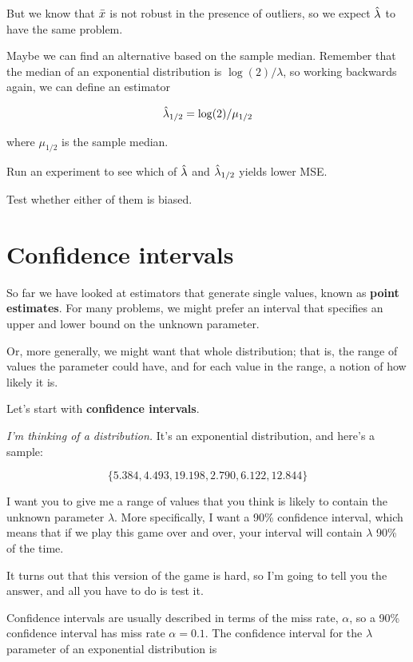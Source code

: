 \documentclass[12pt]{book}
\begin{document}
But we know that $\bar{x}$ is not robust in the presence of outliers, so
we expect $\hat{\lambda}$ to have the same problem.

Maybe we can find an alternative based on the sample median.  Remember
that the median of an exponential distribution is $\log(2) / \lambda$,
so working backwards again, we can define an estimator

\[ \hat{\lambda}_{1/2} = \log(2) / \mu_{1/2} \]

where $\mu_{1/2}$ is the sample median.

\begin{ex}

Run an experiment to see which of $\hat{\lambda}$ and $\hat{\lambda}_{1/2}$ yields
lower MSE.

Test whether either of them is biased.

\end{ex}


\section{Confidence intervals}

So far we have looked at estimators that generate single values, known
as {\bf point estimates}.  For many problems, we might prefer an interval
that specifies an upper and lower bound on the unknown parameter.

Or, more generally, we might want that whole distribution; that is,
the range of values the parameter could have, and for each value in
the range, a notion of how likely it is.

Let's start with {\bf confidence intervals}.

{\em I'm thinking of a distribution.}  It's an exponential distribution, and 
here's a sample:

\[ \{ 5.384, 4.493, 19.198, 2.790, 6.122, 12.844 \} \]

I want you to give me a range of values that you think is likely to
contain the unknown parameter $\lambda$.  More specifically, I want
a 90\% confidence interval, which means that if we play this game over
and over, your interval will contain $\lambda$ 90\% of the time.

It turns out that this version of the game is hard, so I'm going
to tell you the answer, and all you have to do is test it.

Confidence intervals are usually described in terms of the miss rate,
$\alpha$, so a 90\% confidence interval has miss rate $\alpha = 0.1$.
The confidence interval for the $\lambda$ parameter of an exponential
distribution is
\end{document}
